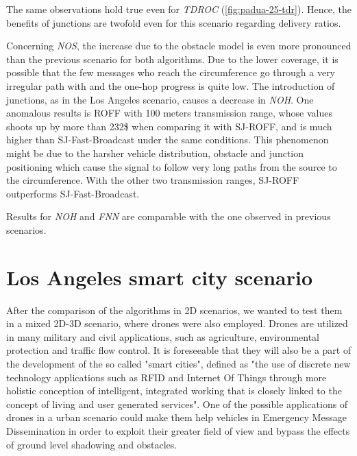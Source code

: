 		
		The same observations hold true even for \textit{TDROC} (\ref{fig:padua-25-tdr}). Hence, the benefits of junctions are twofold even for this scenario regarding delivery ratios.
		
		
		Concerning \textit{NOS}, the increase due to the obstacle model is even more pronounced than the previous scenario for both algorithms. Due to the lower coverage, it is possible that the few messages who reach the circumference go through a very irregular path with and the one-hop progress is quite low. The introduction of junctions, as in the Los Angeles scenario, causes a decrease in \textit{NOH}. One anomalous results is ROFF with 100 meters transmission range, whose values shoots up by more than 232\$ when comparing it with SJ-ROFF, and is much higher than SJ-Fast-Broadcast under the same conditions. This phenomenon might be due to the harsher vehicle distribution, obstacle and junction positioning which cause the signal to follow very long paths from the source to the circumference. With the other two transmission ranges, SJ-ROFF outperforms SJ-Fast-Broadcast.
		
		
		Results for \textit{NOH} and \textit{FNN} are comparable with the one observed in previous scenarios.
		
		
	\section{Los Angeles smart city scenario}
		After the comparison of the algorithms in 2D scenarios, we wanted to test them in a mixed 2D-3D scenario, where drones were also employed. Drones are utilized in many military and civil applications, such as agriculture, environmental protection and traffic flow control. It is foreseeable that they will also be a part of the development of the so called "smart cities", defined as "the use of discrete new technology applications such as RFID and Internet Of Things through more holistic conception of intelligent, integrated working that is closely linked to the concept of living and user generated services"\cite{smartCity}. One of the possible applications of drones in a urban scenario could make them help vehicles in Emergency Message Dissemination in order to exploit their greater field of view and bypass the effects of ground level shadowing and obstacles. 
		
